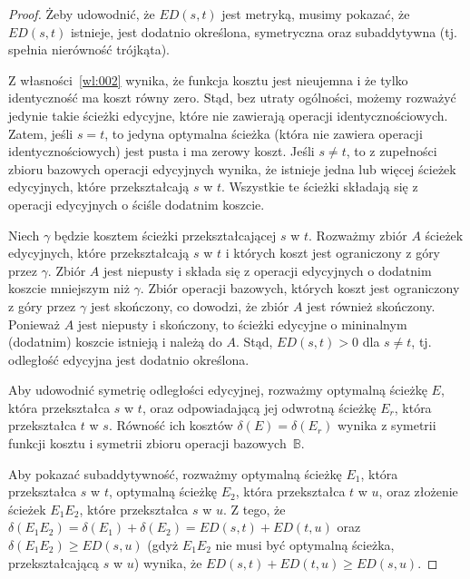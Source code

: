 \documentclass{praca1}
\begin{document}
\begin{proof}
Żeby udowodnić, że $ED(s,t)$ jest metryką, musimy pokazać, że $ED(s,t)$ istnieje, 	jest dodatnio określona, symetryczna oraz subaddytywna (tj. spełnia nierówność trójkąta).

Z własności~\ref{wl:002} wynika, że funkcja kosztu jest nieujemna i że tylko identyczność ma koszt równy zero. Stąd, bez utraty ogólności, możemy rozważyć jedynie takie ścieżki edycyjne, które nie zawierają operacji identycznościowych. Zatem, jeśli $s=t$, to jedyna optymalna ścieżka (która nie zawiera operacji identycznościowych) jest pusta i ma zerowy koszt. Jeśli $s\neq t$, to z zupełności zbioru bazowych operacji edycyjnych wynika, że istnieje jedna lub więcej ścieżek edycyjnych, które przekształcają $s$ w $t$. Wszystkie te ścieżki składają się z operacji edycyjnych o ściśle dodatnim koszcie.

Niech $\gamma$ będzie kosztem ścieżki przekształcającej $s$ w $t$. Rozważmy zbiór $A$ ścieżek edycyjnych, które przekształcają $s$ w $t$ i których koszt jest ograniczony z góry przez $\gamma$. Zbiór $A$ jest niepusty i składa się z operacji edycyjnych o dodatnim koszcie mniejszym niż $\gamma$. Zbiór operacji bazowych, których koszt jest ograniczony z góry przez $\gamma$ jest skończony, co dowodzi, że zbiór $A$ jest również skończony. Ponieważ $A$ jest niepusty i skończony, to ścieżki edycyjne o mininalnym (dodatnim) koszcie istnieją i należą do $A$. Stąd, $ED(s,t) > 0$ dla $s\neq t$, tj. odległość edycyjna jest dodatnio określona.

Aby udowodnić symetrię odległości edycyjnej, rozważmy optymalną ścieżkę $E$, która przekształca $s$ w $t$, oraz odpowiadającą jej odwrotną ścieżkę $E_r$, która przekształca $t$ w $s$. Równość ich kosztów $\delta(E) = \delta(E_r)$ wynika z symetrii funkcji kosztu i symetrii zbioru operacji bazowych~$\mathbb{B}$. 

Aby pokazać subaddytywność, rozważmy optymalną ścieżkę $E_1$, która przekształca $s$ w $t$, optymalną ścieżkę $E_2$, która przekształca $t$ w $u$, oraz złożenie ścieżek $E_1E_2$, które przekształca $s$ w $u$. Z tego, że $\delta(E_1E_2) = \delta(E_1) + \delta(E_2) = ED(s,t)+ED(t,u)$ oraz $\delta(E_1E_2) \geq ED(s,u)$ (gdyż $E_1 E_2$ nie musi być optymalną ścieżka, przekształcającą $s$ w $u$) wynika, że $ED(s,t)+ED(t,u) \geq ED(s,u)$.
\end{proof}
\end{document}
